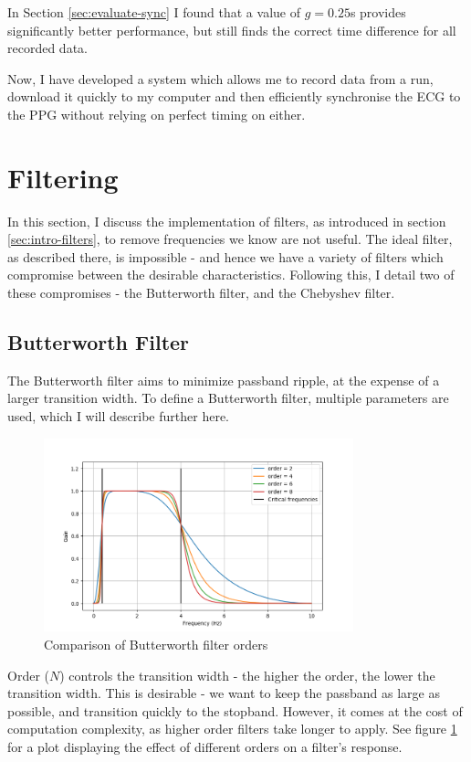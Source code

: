 \documentclass[12pt,a4paper,twoside,openany]{report}
\begin{document}
In Section \ref{sec:evaluate-sync} I found that a value of \(g=0.25\)s
provides significantly better performance, but still finds the correct time
difference for all recorded data.

Now, I have developed a system which allows me to record data from a run,
download it quickly to my computer and then efficiently synchronise the ECG to the PPG
without relying on perfect timing on either.

\section{Filtering}

In this section, I discuss the implementation of filters, as introduced in
section
\ref{sec:intro-filters}, to remove frequencies we know are not useful. 
The ideal filter, as described there, is impossible - and 
hence we have a
variety of filters which compromise between the desirable characteristics.
Following this, I detail two of these compromises - the Butterworth filter,
and the Chebyshev filter.


\subsection{Butterworth Filter}

The Butterworth filter aims to minimize passband ripple, at the expense of a
larger transition width. To define a Butterworth filter, multiple parameters
are used, which I will describe further here.

\begin{figure}[h]
	\centerline{\includegraphics[width=0.8\textwidth]{figs/butter-order-comparison.png}}
\caption{Comparison of Butterworth filter orders}
\label{fig:butterworth-order}
\end{figure}

Order (\(N\)) controls the transition width - the higher the order, the lower
the transition width. This is desirable - we want to keep the passband as
large as possible, and transition quickly to the stopband. However, it comes
at the cost of computation complexity, as higher order filters take longer to
apply. See figure \ref{fig:butterworth-order} for a plot displaying the effect
of different orders on a filter's response.
\end{document}
